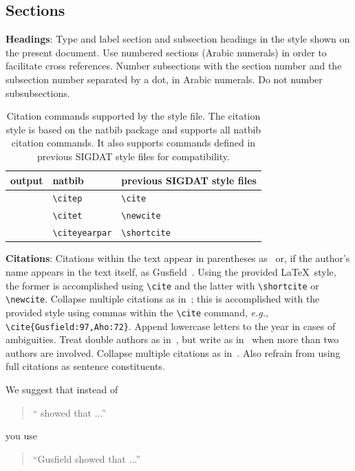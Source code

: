 \documentclass[11pt,a4paper]{article}
\newcommand\conforg{SIGDAT}
\begin{document}
\subsection{Sections}

{\bf Headings}: Type and label section and subsection headings in the
style shown on the present document.  Use numbered sections (Arabic
numerals) in order to facilitate cross references. Number subsections
with the section number and the subsection number separated by a dot,
in Arabic numerals.
Do not number subsubsections.

\begin{table}[t!]
\centering
\begin{tabular}{lll}
  output & natbib & previous \conforg{} style files\\
  \hline
  \citep{Gusfield:97} & \verb|\citep| & \verb|\cite| \\
  \citet{Gusfield:97} & \verb|\citet| & \verb|\newcite| \\
  \citeyearpar{Gusfield:97} & \verb|\citeyearpar| & \verb|\shortcite| \\
\end{tabular}
\caption{Citation commands supported by the style file.
  The citation style is based on the natbib package and
  supports all natbib citation commands.
  It also supports commands defined in previous \conforg{} style files
  for compatibility.
  }
\end{table}

{\bf Citations}: Citations within the text appear in parentheses
as~\cite{Gusfield:97} or, if the author's name appears in the text
itself, as Gusfield~.
Using the provided \LaTeX\ style, the former is accomplished using
{\small\verb|\cite|} and the latter with {\small\verb|\shortcite|} or {\small\verb|\newcite|}. Collapse multiple citations as in~\cite{Gusfield:97,Aho:72}; this is accomplished with the provided style using commas within the {\small\verb|\cite|} command, {\em e.g.}, {\small\verb|\cite{Gusfield:97,Aho:72}|}. Append lowercase letters to the year in cases of ambiguities.  
 Treat double authors as
in~\cite{Aho:72}, but write as in~\cite{Chandra:81} when more than two
authors are involved. Collapse multiple citations as
in~\cite{Gusfield:97,Aho:72}. Also refrain from using full citations
as sentence constituents.

We suggest that instead of
\begin{quote}
  ``\cite{Gusfield:97} showed that ...''
\end{quote}
you use
\begin{quote}
``Gusfield    showed that ...''
\end{quote}
\end{document}
